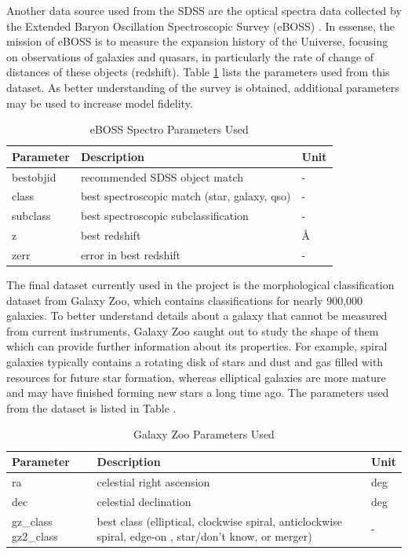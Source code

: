 \documentclass[11pt,sigconf]{acmart}
\begin{document}
Another data source used from the SDSS are the optical spectra data collected by the 
Extended Baryon Oscillation Spectroscopic Survey (eBOSS) \cite{galaxy_eboss}. In essense,
the mission of eBOSS is to measure the expansion history of the Universe, focusing on 
observations of galaxies and quasars, in particularly the rate of change of 
distances of these objects (redshift). Table \ref{tab:table_eboss} lists the parameters 
used from this dataset. As better understanding of the survey is obtained, additional 
parameters may be used to increase model fidelity.  

\begin{table}[]
  \begin{tabular}{ |p{1.8cm}|p{4.0cm}|p{1.0cm}|  } \hline
   \textbf{Parameter} & \textbf{Description} & \textbf{Unit}  \\ \hline
   bestobjid & recommended SDSS object match  & - \\ \hline
   class & best spectroscopic match (star, galaxy, qso) & - \\ \hline
   subclass & best spectroscopic subclassification & - \\ \hline
   z & best redshift & \AA \\ \hline
   zerr & error in best redshift & - \\ \hline
  \end{tabular}
  \caption{\label{tab:table_eboss}eBOSS Spectro Parameters Used}
  \end{table}

The final dataset currently used in the project is the morphological classification dataset 
from Galaxy Zoo, which contains classifications for nearly 900,000 galaxies. To better 
understand details about a galaxy that cannot be measured from current instruments, Galaxy Zoo 
saught out to study the shape of them which can provide further information about its properties. 
For example, spiral galaxies typically contains a rotating disk of stars and dust and gas 
filled with resources for future star formation, whereas elliptical galaxies are more mature and 
may have finished forming new stars a long time ago. The parameters used from the dataset is listed 
in Table .

\begin{table}[]
  \begin{tabular}{ |p{1.8cm}|p{4.0cm}|p{1.0cm}|  } \hline
   \textbf{Parameter} & \textbf{Description} & \textbf{Unit}  \\ \hline
   ra & celestial right ascension  & deg \\ \hline
   dec & celestial declination & deg \\ \hline
   gz\_class gz2\_class & best class (elliptical, clockwise spiral, anticlockwise spiral, edge-on , star/don't know, or merger) & - \\ \hline
  \end{tabular}
  \caption{\label{tab:tablegzoo}Galaxy Zoo Parameters Used}
  \end{table}
\end{document}
